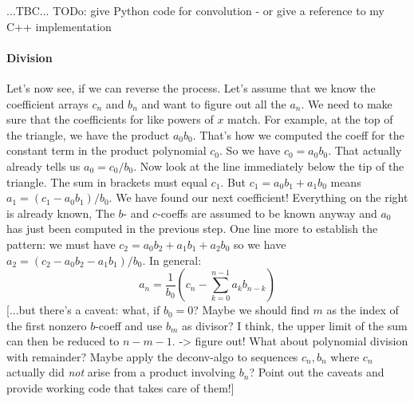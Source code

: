 ...TBC... TODo: give Python code for convolution - or give a reference to my C++ implementation



\paragraph{Division}
Let's now see, if we can reverse the process. Let's assume that we know the coefficient arrays $c_n$ and $b_n$ and want to figure out all the $a_n$. We need to make sure that the coefficients for like powers of $x$ match. For example, at the top of the triangle, we have the product $a_0 b_0$. That's how we computed the coeff for the constant term in the product polynomial $c_0$. So we have $c_0 = a_0 b_0$. That actually already tells us $a_0 = c_0 / b_0$. Now look at the line immediately below the tip of the triangle. The sum in brackets must equal $c_1$. But $c_1 = a_0 b_1 + a_1 b_0$ means $a_1 = (c_1 -a_0 b_1)/b_0$. We have found our next coefficient! Everything on the right is already known, The $b$- and $c$-coeffs are assumed to be known anyway and $a_0$ has just been computed in the previous step. One line more to establish the pattern: we must have $c_2 = a_0 b_2 + a_1 b_1 + a_2 b_0$ so we have $a_2 = (c_2 - a_0 b_2 - a_1 b_1)/b_0$. In general:
\begin{equation}
a_n = \frac{1}{b_0} (  c_n - \sum_{k=0}^{n-1} a_k b_{n-k} ) 
\end{equation}
[...but there's a caveat: what, if $b_0 = 0$? Maybe we should find $m$ as the index of the first nonzero $b$-coeff and use $b_m$ as divisor? I think, the upper limit of the sum can then be reduced to $n-m-1$. -> figure out! What about polynomial division with remainder? Maybe apply the deconv-algo to sequences $c_n, b_n$ where $c_n$ actually did \emph{not} arise from a product involving $b_n$? Point out the caveats and provide working code that takes care of them!]



